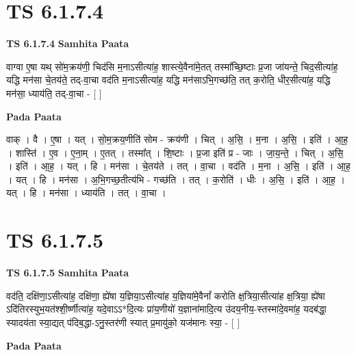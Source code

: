 \documentclass[17pt]{extarticle}
\begin{document}
\section*{ TS 6.1.7.4 }

\textbf{TS 6.1.7.4 } \newline
\textbf{Samhita Paata} \newline

वाग्वा ए॒षा यथ् सो॑म॒क्रय॑णी॒ चिद॑सि म॒नाऽसीत्या॑ह॒ शास्त्ये॒वैना॑मे॒तत् तस्मा᳚च्छि॒ष्टाः प्र॒जा जा॑यन्ते॒ चिद॒सीत्या॑ह॒ यद्धि मन॑सा चे॒तय॑ते॒ तद्-वा॒चा वद॑ति म॒नाऽसीत्या॑ह॒ यद्धि मन॑साऽभि॒गच्छ॑ति॒ तत् क॒रोति॒ धीर॒सीत्या॑ह॒ यद्धि मन॑सा॒ ध्याय॑ति॒ तद्-वा॒चा - [  ] \newline

\textbf{Pada Paata} \newline

वाक् । वै । ए॒षा । यत् । सो॒म॒क्रय॒णीति॑ सोम - क्रय॑णी । चित् । अ॒सि॒ । म॒ना । अ॒सि॒ । इति॑ । आ॒ह॒ । शास्ति॑ । ए॒व । ए॒ना॒म् । ए॒तत् । तस्मा᳚त् । शि॒ष्टाः । प्र॒जा इति॑ प्र - जाः । जा॒य॒न्ते॒ । चित् । अ॒सि॒ । इति॑ । आ॒ह॒ । यत् । हि । मन॑सा । चे॒तय॑ते । तत् । वा॒चा । वद॑ति । म॒ना । अ॒सि॒ । इति॑ । आ॒ह॒ । यत् । हि । मन॑सा । अ॒भि॒गच्छ॒तीत्य॑भि - गच्छ॑ति । तत् । क॒रोति॑ । धीः । अ॒सि॒ । इति॑ । आ॒ह॒ । यत् । हि । मन॑सा । ध्याय॑ति । तत् । वा॒चा ।  \newline




\section*{ TS 6.1.7.5 }

\textbf{TS 6.1.7.5 } \newline
\textbf{Samhita Paata} \newline

वद॑ति॒ दक्षि॑णा॒ऽसीत्या॑ह॒ दक्षि॑णा॒ ह्ये॑षा य॒ज्ञिया॒ऽसीत्या॑ह य॒ज्ञिया॑मे॒वैनां᳚ करोति क्ष॒त्रिया॒सीत्या॑ह क्ष॒त्रिया॒ ह्ये॑षा ऽदि॑तिरस्युभ॒यत॑श्शी॒र्ष्णीत्या॑ह॒ यदे॒वाऽऽ*दि॒त्यः प्रा॑य॒णीयो॑ य॒ज्ञाना॑मादि॒त्य उ॑दय॒नीय॒-स्तस्मा॑दे॒वमा॑ह॒ यदब॑द्धा॒ स्यादय॑ता स्या॒द्यत् प॑दिब॒द्धा-ऽनु॒स्तर॑णी स्यात् प्र॒मायु॑को॒ यज॑मानः स्या॒ - [  ] \newline

\textbf{Pada Paata} \newline
\end{document}
